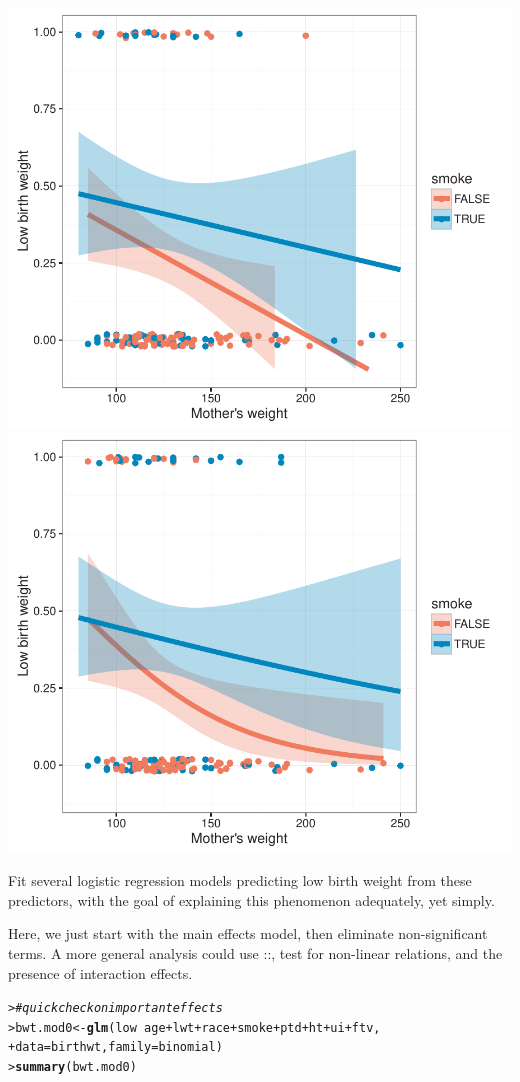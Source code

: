 \documentclass[10pt]{report}\usepackage[]{graphicx}\usepackage[]{color}
\makeatletter
\newcommand{\hlcom}[1]{\textcolor[rgb]{0.678,0.584,0.686}{\textit{#1}}}%
\newcommand{\hlopt}[1]{\textcolor[rgb]{0,0,0}{#1}}%
\newcommand{\hlstd}[1]{\textcolor[rgb]{0.345,0.345,0.345}{#1}}%
\newcommand{\hlkwb}[1]{\textcolor[rgb]{0.69,0.353,0.396}{#1}}%
\newcommand{\hlkwc}[1]{\textcolor[rgb]{0.333,0.667,0.333}{#1}}%
\newcommand{\hlkwd}[1]{\textcolor[rgb]{0.737,0.353,0.396}{\textbf{#1}}}%
\newenvironment{kframe}{%
 \def\at@end@of@kframe{}%
 \ifinner\ifhmode%
  \def\at@end@of@kframe{\end{minipage}}%
  \begin{minipage}{\columnwidth}%
 \fi\fi%
 \def\FrameCommand##1{\hskip\@totalleftmargin \hskip-\fboxsep
 \colorbox{shadecolor}{##1}\hskip-\fboxsep
     \hskip-\linewidth \hskip-\@totalleftmargin \hskip\columnwidth}%
 \MakeFramed {\advance\hsize-\width
   \@totalleftmargin\z@ \linewidth\hsize
   \@setminipage}}%
 {\par\unskip\endMakeFramed%
 \at@end@of@kframe}
\newenvironment{knitrout}{}{} %
\renewenvironment{knitrout}{\small\renewcommand{\baselinestretch}{.85}}{} %
\makeatother
\begin{document}
\begin{Exercises}
\begin{enumerate*}
\begin{ans}
\begin{knitrout}
\centerline{\includegraphics[width=.5\textwidth]{soln/fig/ex7_6a2-1} 
\includegraphics[width=.5\textwidth]{soln/fig/ex7_6a2-2} }



\end{knitrout}
    \end{ans}
    
    \item Fit several logistic regression models predicting low birth weight from these predictors, with the goal of explaining this phenomenon adequately, yet simply.
    \begin{ans}
    Here, we just start with the main effects model, then eliminate non-significant terms.
    A more general analysis could use ::, test for non-linear relations,
    and the presence of interaction effects.
\begin{knitrout}\footnotesize
{}\color{fgcolor}\begin{kframe}
\begin{alltt}
\hlstd{> }\hlcom{# quick check on important effects}
\hlstd{> }\hlstd{bwt.mod0} \hlkwb{<-} \hlkwd{glm}\hlstd{(low} \hlopt{~} \hlstd{age} \hlopt{+} \hlstd{lwt} \hlopt{+} \hlstd{race} \hlopt{+} \hlstd{smoke} \hlopt{+} \hlstd{ptd} \hlopt{+} \hlstd{ht} \hlopt{+} \hlstd{ui} \hlopt{+} \hlstd{ftv,}
\hlstd{+ }                \hlkwc{data}\hlstd{=birthwt,} \hlkwc{family} \hlstd{= binomial)}
\hlstd{> }\hlkwd{summary}\hlstd{(bwt.mod0)}
\end{alltt}
\begin{verbatim}


\end{verbatim}
\end{kframe}
\end{knitrout}
\end{ans}
\end{enumerate*}
\end{Exercises}
\end{document}
